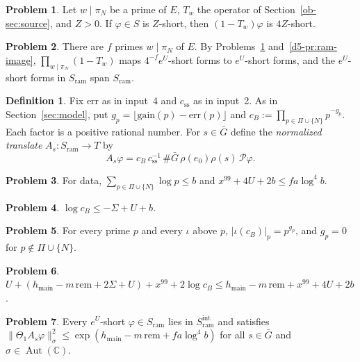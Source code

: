 \documentclass[reqno]{amsart}
\theoremstyle{definition}
\newtheorem{problem}{Problem}[section]
\theoremstyle{plain}
\theoremstyle{definition}
\newtheorem{definition}[theorem]{Definition}
\newcommand{\C}{\mathbb{C}}
\newcommand{\gain}{\mathrm{gain}}
\newcommand{\err}{\mathrm{err}}
\newcommand{\rem}{\mathrm{rem}}
\newcommand{\hm}{h_{\mathrm{main}}}
\newcommand{\Sram}{S_{\mathrm{ram}}}
\newcommand{\Gb}{\bar G}
\newcommand{\Aut}{\operatorname{Aut}}
\begin{document}
\begin{problem}\label{pr:translate-short}
Let \(w \mid \pi_N\) be a prime of \(E\), \(T_w\) the operator of Section~\ref{ob-sec:source}, and \(Z > 0\).  If \(\varphi \in S\) is \(Z\)-short, then \((1 - T_w)\varphi\) is \(4Z\)-short.
\end{problem}

\begin{problem}\label{pr:ramify-short}
There are \(f\) primes \(w \mid \pi_N\) of \(E\).  By Problems~\ref{pr:translate-short} and~\ref{d5-pr:ram-image}, \(\prod_{w \mid \pi_N}(1 - T_w)\) maps \(4^{-f}e^U\)-short forms to \(e^U\)-short forms, and the \(e^U\)-short forms in \(\Sram\) span \(\Sram\).
\end{problem}

\begin{definition}\label{def:normalized}
Fix \(\err\) as in input~4 and \(c_{\mathrm{ss}}\) as in input~2.  As in Section~\ref{sec:model}, put \(g_p = \lfloor\gain(p) - \err(p)\rfloor\) and \(c_B := \prod_{p \in \Pi \cup \{N\}}p^{-g_p}\).  Each factor is a positive rational number.  For \(s \in \Gb\) define the \emph{normalized translate} \(A_s\colon \Sram \to T\) by
\[
  A_s\varphi = c_B\,c_{\mathrm{ss}}^{-1}\,\#\Gb\,\rho(e_0)\rho(s)\,\mathcal{P}\varphi .
\]
\end{definition}

\begin{problem}\label{pr:scales}
For data, \(\sum_{p \in \Pi \cup \{N\}}\log p \le b\) and \(x^{99} + 4U + 2b \le fa\log^4 b\).
\end{problem}

\begin{problem}\label{pr:cB-general}
\(\log c_B \le -\Sigma + U + b\).
\end{problem}

\begin{problem}\label{pr:cB-padic}
For every prime \(p\) and every \(\iota\) above \(p\), \(\lvert\iota(c_B)\rvert_p = p^{g_p}\), and \(g_p = 0\) for \(p \notin \Pi \cup \{N\}\).
\end{problem}

\begin{problem}\label{pr:exponent-a}
\(U + (\hm - m\,\rem + 2\Sigma + U) + x^{99} + 2\log c_B \le \hm - m\,\rem + x^{99} + 4U + 2b\).
\end{problem}

\begin{problem}\label{pr:short-lifts}
Every \(e^U\)-short \(\varphi \in \Sram\) lies in \(\Sram^{\mathrm{int}}\) and satisfies \(\lVert\Theta_1 A_s\varphi\rVert_\sigma^2 \le \exp(\hm - m\,\rem + fa\log^4 b)\) for all \(s \in \Gb\) and \(\sigma \in \Aut(\C)\).
\end{problem}
\end{document}
